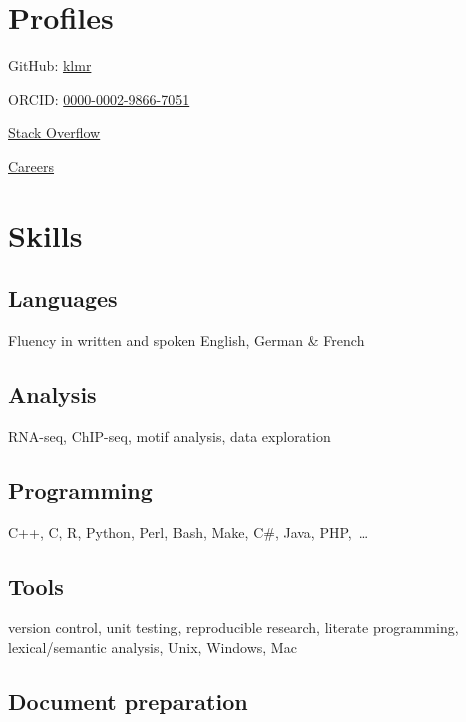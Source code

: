 \documentclass{klmr-cv}
\newcommand*\csharp{C\#}
\newcommand*\cpp{C++}
\begin{document}
\date{2003}
\item{}

\section{Profiles}

\item{GitHub: \href{http://github.com/klmr}{klmr}}
\item{ORCID: \href{http://orcid.org/0000-0002-9866-7051}{0000-0002-9866-7051}}
\item{\href{http://stackoverflow.com/users/1968/konrad-rudolph}{Stack Overflow}}
\item{\href{http://careers.stackoverflow.com/klmr}{Careers}}

\section{Skills}

\subsection{Languages}

\item{Fluency in written and spoken English, German \& French}

\subsection{Analysis}

\item{RNA-seq, ChIP-seq, motif analysis, data exploration}

\subsection{Programming}

\item{\cpp, C, R, Python, Perl, Bash, Make, \csharp, Java, PHP,~…}

\subsection{Tools}

\item{version control, unit testing, reproducible research, literate
    programming, lexical/semantic analysis, Unix, Windows, Mac}

\subsection{Document preparation}
\end{document}
